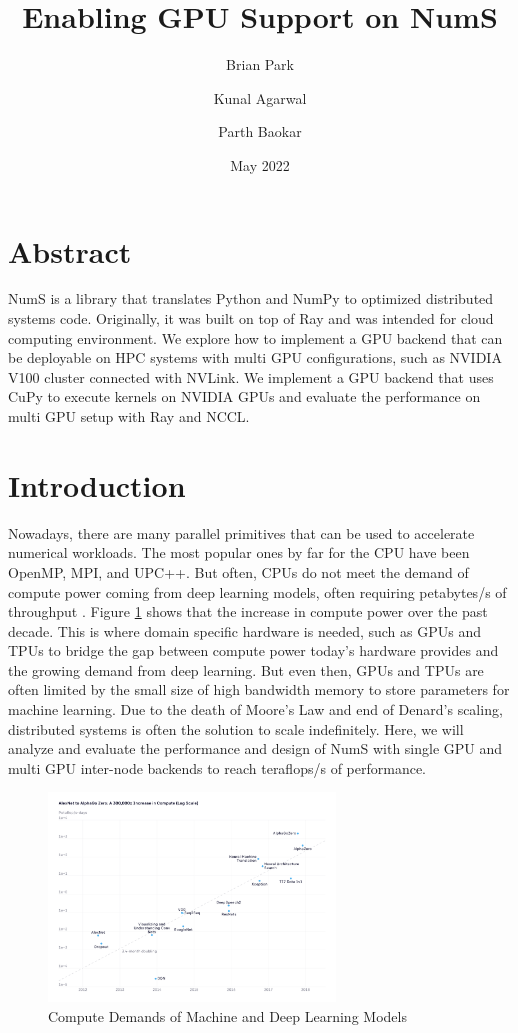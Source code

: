 \documentclass{article}
\title{Enabling GPU Support on NumS}
\author{Brian Park}
\author{Kunal Agarwal}
\author{Parth Baokar}
\affil{UC Berkeley, Computer Science 267}
\date{May 2022}
\begin{document}
\maketitle

\section*{Abstract}
NumS is a library that translates Python and NumPy to optimized distributed systems code. Originally, it was built on top of Ray and was intended for cloud computing environment. We explore how to implement a GPU backend that can be deployable on HPC systems with multi GPU configurations, such as NVIDIA V100 cluster connected with NVLink. We implement a GPU backend that uses CuPy to execute kernels on NVIDIA GPUs and evaluate the performance on multi GPU setup with Ray and NCCL.

\section{Introduction}
Nowadays, there are many parallel primitives that can be used to accelerate numerical workloads. The most popular ones by far for the CPU have been OpenMP, MPI, and UPC++. But often, CPUs do not meet the demand of compute power coming from deep learning models, often requiring petabytes/s of throughput \cite{openai}. Figure \ref{fig:openai} shows that the increase in compute power over the past decade. This is where domain specific hardware is needed, such as GPUs and TPUs to bridge the gap between compute power today's hardware provides and the growing demand from deep learning. But even then, GPUs and TPUs are often limited by the small size of high bandwidth memory to store parameters for machine learning. Due to the death of Moore's Law and end of Denard's scaling, distributed systems is often the solution to scale indefinitely. Here, we will analyze and evaluate the performance and design of NumS with single GPU and multi GPU inter-node backends to reach teraflops/s of performance.

\begin{figure}
  \centerline{\includegraphics[width=3in]{figures/ai-and-compute-modern-log.png}}
  \caption{Compute Demands of Machine and Deep Learning Models}
  \label{fig:openai}
\end{figure}
\end{document}
